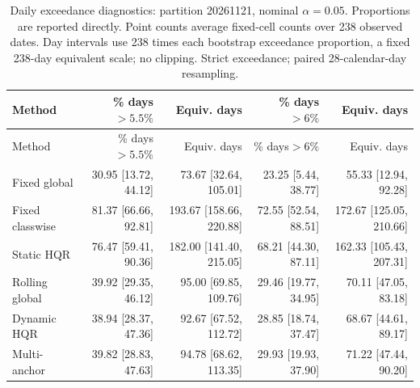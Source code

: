 \begingroup\small\setlength{\tabcolsep}{3pt}
\begin{longtable}{lrrrr}
\caption{Daily exceedance diagnostics: partition 20261121, nominal $\alpha=0.05$. Proportions are reported directly. Point counts average fixed-cell counts over 238 observed dates. Day intervals use 238 times each bootstrap exceedance proportion, a fixed 238-day equivalent scale; no clipping. Strict exceedance; paired 28-calendar-day resampling.}\label{tab:final-risk-0-0-exceed}\\
\toprule
Method & \% days$>5.5\%$ & Equiv. days & \% days$>6\%$ & Equiv. days\\
\midrule
\endfirsthead
\toprule
Method & \% days$>5.5\%$ & Equiv. days & \% days$>6\%$ & Equiv. days\\
\midrule
\endhead
Fixed global & 30.95 [13.72, 44.12] & 73.67 [32.64, 105.01] & 23.25 [5.44, 38.77] & 55.33 [12.94, 92.28]\\
Fixed classwise & 81.37 [66.66, 92.81] & 193.67 [158.66, 220.88] & 72.55 [52.54, 88.51] & 172.67 [125.05, 210.66]\\
Static HQR & 76.47 [59.41, 90.36] & 182.00 [141.40, 215.05] & 68.21 [44.30, 87.11] & 162.33 [105.43, 207.31]\\
Rolling global & 39.92 [29.35, 46.12] & 95.00 [69.85, 109.76] & 29.46 [19.77, 34.95] & 70.11 [47.05, 83.18]\\
Dynamic HQR & 38.94 [28.37, 47.36] & 92.67 [67.52, 112.72] & 28.85 [18.74, 37.47] & 68.67 [44.61, 89.17]\\
Multi-anchor & 39.82 [28.83, 47.63] & 94.78 [68.62, 113.35] & 29.93 [19.93, 37.90] & 71.22 [47.44, 90.20]\\
\bottomrule
\end{longtable}
\endgroup
